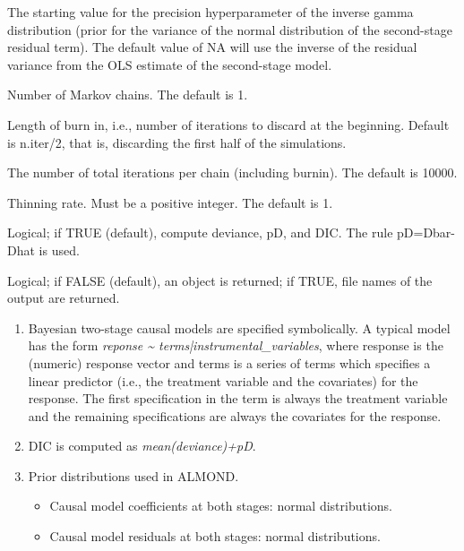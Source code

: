 \documentclass[a4paper]{book}
\begin{document}
\begin{Arguments}
\begin{ldescription}
\item[\code{e.start}] The starting value for the precision hyperparameter of the inverse gamma distribution
(prior for the variance of the normal distribution of the second-stage residual term).
The default value of NA will use the inverse of the residual variance from the OLS estimate
of the second-stage model.

\item[\code{n.chains}] Number of Markov chains. The default is 1.

\item[\code{n.burnin}] Length of burn in, i.e., number of iterations to discard at the beginning.
Default is n.iter/2, that is, discarding the first half of the simulations.

\item[\code{n.iter}] The number of total iterations per chain (including burnin). The default is 10000.

\item[\code{n.thin}] Thinning rate. Must be a positive integer. The default is 1.

\item[\code{DIC}] Logical; if TRUE (default), compute deviance, pD, and DIC. The rule pD=Dbar-Dhat is used.

\item[\code{codaPkg}] Logical; if FALSE (default), an object is returned; if TRUE,
file names of the output are returned.
\end{ldescription}
\end{Arguments}
%
\begin{Details}\relax
\begin{enumerate}

\item Bayesian two-stage causal models are specified symbolically.
A typical model has the form \emph{reponse \textasciitilde{} terms|instrumental\_variables},
where response is the (numeric) response vector and terms is a series of terms
which specifies a linear predictor (i.e., the treatment variable and the covariates) for the response.
The first specification in the term is always the treatment variable and
the remaining specifications are always the covariates for the response.
\item DIC is computed as \emph{mean(deviance)+pD}.
\item Prior distributions used in ALMOND.
\begin{itemize}

\item Causal model coefficients at both stages: normal distributions.
\item Causal model residuals at both stages: normal distributions.

\end{itemize}


\end{enumerate}

\end{Details}
\end{document}
